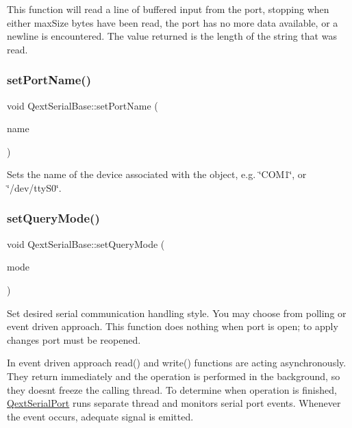This function will read a line of buffered input from the port, stopping when either max\+Size bytes have been read, the port has no more data available, or a newline is encountered. The value returned is the length of the string that was read. \mbox{\label{class_qext_serial_base_a1c9f83f00f0ea53ee06b757e197cdf64}} 
\subsubsection{\texorpdfstring{set\+Port\+Name()}{setPortName()}}
{\footnotesize\ttfamily void Qext\+Serial\+Base\+::set\+Port\+Name (\begin{DoxyParamCaption}\item[{const Q\+String \&}]{name }\end{DoxyParamCaption})\hspace{0.3cm}{\ttfamily [virtual]}}

Sets the name of the device associated with the object, e.\+g. \char`\"{}\+C\+O\+M1\char`\"{}, or \char`\"{}/dev/tty\+S0\char`\"{}. \mbox{\label{class_qext_serial_base_abd8e3b9a5028f9c2645ba89c0fc08a6b}} 
\subsubsection{\texorpdfstring{set\+Query\+Mode()}{setQueryMode()}}
{\footnotesize\ttfamily void Qext\+Serial\+Base\+::set\+Query\+Mode (\begin{DoxyParamCaption}\item[{Query\+Mode}]{mode }\end{DoxyParamCaption})\hspace{0.3cm}{\ttfamily [virtual]}}

Set desired serial communication handling style. You may choose from polling or event driven approach. This function does nothing when port is open; to apply changes port must be reopened.

In event driven approach read() and write() functions are acting asynchronously. They return immediately and the operation is performed in the background, so they doesn\textquotesingle{}t freeze the calling thread. To determine when operation is finished, \mbox{\hyperlink{class_qext_serial_port}{Qext\+Serial\+Port}} runs separate thread and monitors serial port events. Whenever the event occurs, adequate signal is emitted.

